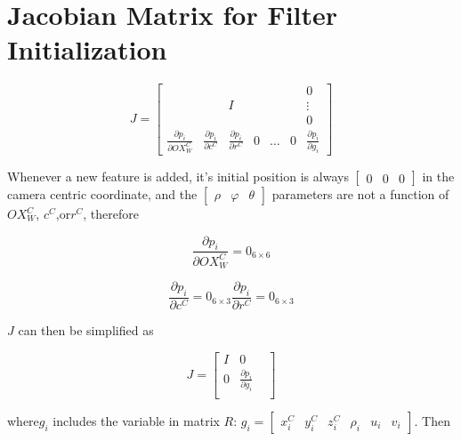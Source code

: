\chapter{Jacobian Matrix for Filter Initialization}
\begin{equation}
J=\begin{bmatrix}
 & & & & & &0\\
 & &I& & & &\vdots\\ 
 & & & & & &0\\
\frac{\partial p_{i}}{\partial OX_{W}^{C}} &
\frac{\partial p_{i}}{\partial c^{C}} & 
\frac{\partial p_{i}}{\partial r^{C}} & 
0 & \ldots & 0 & 
\frac{\partial p_{i}}{\partial g_{i}} 
\end{bmatrix}
\end{equation}

Whenever a new feature is added, it's initial position is always $
\begin{bmatrix}0&0&0\end{bmatrix}$ in the camera centric coordinate,
and the $\begin{bmatrix}\rho&\varphi&\theta\end{bmatrix}$ parameters
are not a function of $ OX_{W}^{C}$, $c^{C}$,or$r^{C}$, therefore

\begin{equation}
\frac{\partial p_{i}}{\partial OX_{W}^{C}}=0_{6\times 6}
\end{equation}

\begin{equation}
\frac{\partial p_{i}}{\partial c^{C}}=0_{6\times 3}\frac{\partial 
p_{i}}{\partial r^{C}}= 0_{6\times 3}
\end{equation}

$J$ can then be simplified as

\begin{equation}
J=\begin{bmatrix}
I & 0 & \\
0 & \frac{\partial p_{i}}{\partial g_{i}} & \\
\end{bmatrix} 
\end{equation}


\noindent where$g_{i}$ includes the variable in matrix $R$: $
g_{i}=[\begin{matrix}
x_{i}^{C} & y_{i}^{C} & z_{i}^{C} & \rho _{i} & u_{i} & v_{i}
\end{matrix}
]$. Then 

